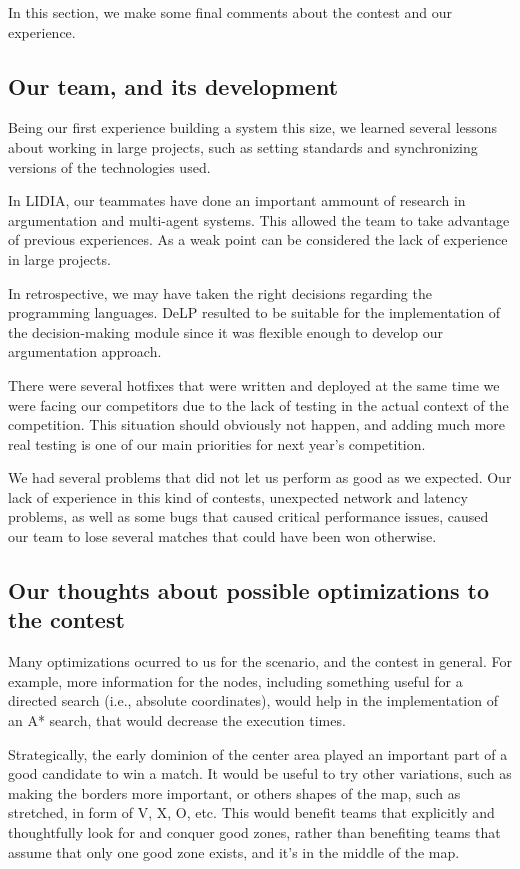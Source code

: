 \documentclass{llncs2e/llncs}
\begin{document}
    In this section, we make some final comments about the contest and our experience.

\subsection{Our team, and its development}

    Being our first experience building a system this size, we learned several
    lessons about working in large projects, such as setting standards and
    synchronizing versions of the technologies used.

    In LIDIA, our teammates have done an important ammount of research in argumentation
    and multi-agent systems. This allowed the team to take advantage of previous experiences. 
    As a weak point can be considered the lack of experience in large projects.

    In retrospective, we may have taken the right decisions regarding the programming languages. 
    DeLP resulted to be suitable for the implementation of the decision-making module since
    it was flexible enough to develop our argumentation approach.

    There were several hotfixes that were written and deployed at the same time we
    were facing our competitors due to the lack of testing in the actual context of
    the competition. This situation should obviously not happen, and adding much
    more real testing is one of our main priorities for next year's competition.

    We had several problems that did not let us perform as good as we expected.  Our
    lack of experience in this kind of contests, unexpected network and latency
    problems, as well as some bugs that caused critical performance issues, caused
    our team to lose several matches that could have been won otherwise.

\subsection{Our thoughts about possible optimizations to the contest}
    
    Many optimizations ocurred to us for the scenario, and the contest in general. 
    For example, more information for the nodes, including something useful for a 
    directed search (i.e., absolute coordinates), would help in the implementation 
    of an A* search, that would decrease the execution times.

    Strategically, the early dominion of the center area played an important part 
    of a good candidate to win a match. It would be useful to try other 
    variations, such as making the borders more important, or others shapes of the 
    map, such as stretched, in form of V, X, O, etc. This would benefit teams that 
    explicitly and thoughtfully look for and conquer good zones, rather than 
    benefiting teams that assume that only one good zone exists, and it's in the 
    middle of the map.
\end{document}
